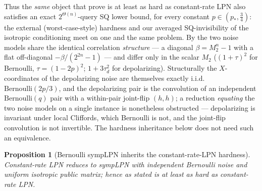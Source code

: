 \documentclass[11pt,a4paper]{article}
\theoremstyle{plain}
\newtheorem{proposition}[theorem]{Proposition}
\theoremstyle{definition}
\begin{document}
Thus the \emph{same} object that \cite{KLP+25,LPQR26} prove is at least as hard as constant-rate LPN also satisfies an exact $2^{\Theta(n)}$-query SQ lower bound, for every constant $p\in(p_*,\tfrac34)$: the external (worst-case-style) hardness and our averaged SQ-invisibility of the isotropic conditioning meet on one and the same problem. By  the two noise models share the identical correlation \emph{structure} --- a diagonal $\beta=M_2^n-1$ with a flat off-diagonal $-\beta/(2^{2n}-1)$ --- and differ only in the scalar $M_2$ ($(1+\tau)^2$ for Bernoulli, $\tau=(1-2p)^2$; $1+3\tau_d^2$ for depolarizing). Structurally the $X$-coordinates of the depolarizing noise are themselves exactly i.i.d.\ $\mathrm{Bernoulli}(2p/3)$, and the depolarizing pair is the convolution of an independent $\mathrm{Bernoulli}(q)$ pair with a within-pair joint-flip $(h,h)$; a reduction \emph{equating} the two noise models on a single instance is nonetheless obstructed --- depolarizing is invariant under local Cliffords, which Bernoulli is not, and the joint-flip convolution is not invertible. The hardness inheritance below does not need such an equivalence.

\begin{proposition}[Bernoulli sympLPN inherits the constant-rate-LPN hardness]
\label{prop:bernoulli-inherits}
Constant-rate LPN reduces to sympLPN \emph{with independent Bernoulli noise} and uniform isotropic public matrix; hence  as stated is at least as hard as constant-rate LPN.
\end{proposition}
\end{document}
